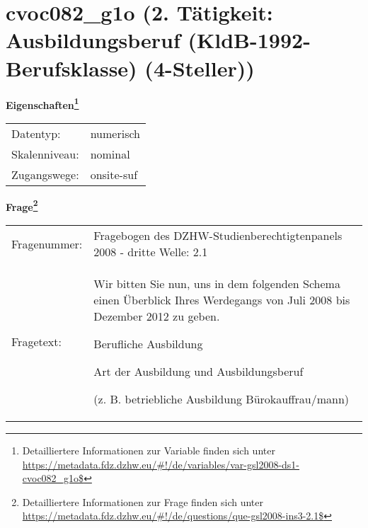 
    \setcounter{footnote}{0}

    \vspace*{-1.8cm}
	\section{cvoc082\_g1o (2. Tätigkeit: Ausbildungsberuf (KldB-1992-Berufsklasse) (4-Steller))}
	\label{section:cvoc082_g1o}



    \vspace*{0.5cm}
    \noindent\textbf{Eigenschaften\footnote{Detailliertere Informationen zur Variable finden sich unter
		\url{https://metadata.fdz.dzhw.eu/\#!/de/variables/var-gsl2008-ds1-cvoc082_g1o$}}}\\
	\begin{tabularx}{\hsize}{@{}lX}
	Datentyp: & numerisch \\
	Skalenniveau: & nominal \\
	Zugangswege: &
	  onsite-suf
 \\
    \end{tabularx}



				\vspace*{0.5cm}
                \noindent\textbf{Frage\footnote{Detailliertere Informationen zur Frage finden sich unter
		              \url{https://metadata.fdz.dzhw.eu/\#!/de/questions/que-gsl2008-ins3-2.1$}}}\\
				\begin{tabularx}{\hsize}{@{}lX}
					Fragenummer: &
					  Fragebogen des DZHW-Studienberechtigtenpanels 2008 - dritte Welle:
					  2.1
 \\
					Fragetext: & Wir bitten Sie nun, uns in dem folgenden Schema einen Überblick Ihres Werdegangs von Juli 2008 bis Dezember 2012 zu geben.\par  Berufliche Ausbildung\par  Art der Ausbildung und Ausbildungsberuf\par  (z. B. betriebliche Ausbildung Bürokauffrau/mann) \\
				\end{tabularx}





